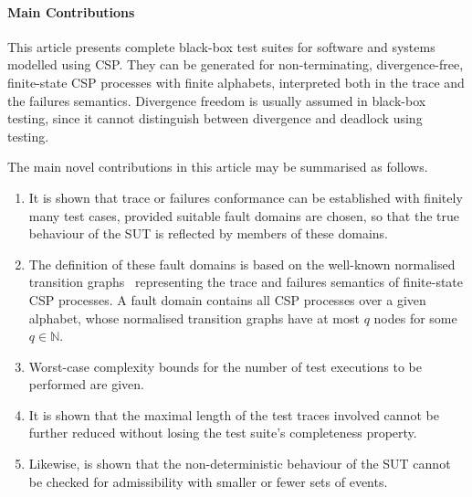 \documentclass[3p,times]{elsarticle}
\begin{document}

\paragraph{Main Contributions}

This article presents   complete black-box test suites for software and
systems modelled using CSP. They can be generated for non-terminating,
divergence-free, finite-state CSP processes with finite alphabets,
interpreted both in the trace and the failures semantics. Divergence freedom
is usually assumed in black-box testing, since it cannot distinguish between
divergence and deadlock using testing.

\newpage
\noindent %
The main novel contributions in this article may be summarised as
follows.
\begin{enumerate}
\item It is shown that trace or failures conformance can be established
    with finitely many test cases, provided suitable fault domains are
    chosen, so that the true behaviour of the SUT is reflected by members
    of these domains.

\item The definition of these fault domains is based on the well-known normalised transition graphs~\cite{Roscoe:1994:chapter} representing the  trace and failures semantics of finite-state CSP processes. A fault domain contains all CSP processes over a given alphabet, whose normalised transition graphs have at most $q$ nodes for some $q\in\mathbb{N}$.

\item Worst-case complexity bounds for the number of test executions to be performed are given.

\item It is shown that the maximal length of the test traces involved cannot be further reduced without losing the test suite's completeness property.

\item Likewise, is shown that the non-deterministic behaviour of the SUT cannot be
checked for admissibility with smaller or fewer sets of events.
\end{enumerate}

\end{document}
